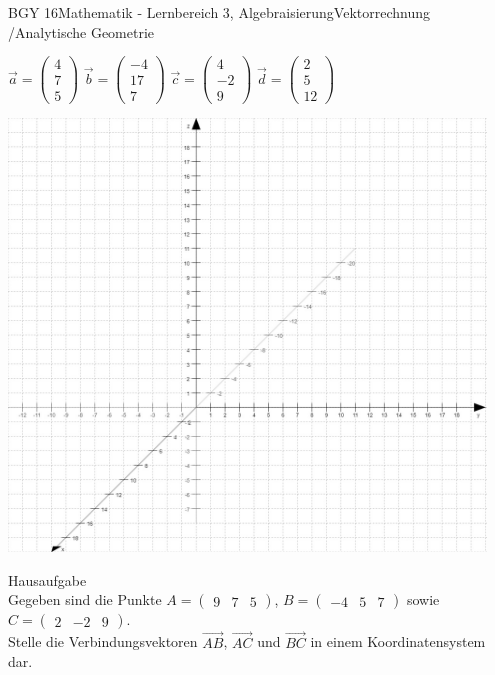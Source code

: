\documentclass[oneside,openany,headings=optiontotoc,11pt,numbers=noenddot]{scrreprt}
\begin{document}
\begin{worksheet}{BGY 16}{Mathematik - Lernbereich 3, Algebraisierung}{Vektorrechnung /Analytische Geometrie}
\begin{framed}
			\par
			\( \overrightarrow{a} = \begin{pmatrix} 4 \\ 7 \\ 5\end{pmatrix}\) \hfill \(\overrightarrow{b} = \begin{pmatrix}-4 \\ 17 \\ 7 \end{pmatrix}\) \hfill \( \overrightarrow{c} = \begin{pmatrix}4 \\ -2 \\ 9\end{pmatrix}\) \hfill \( \overrightarrow{d} = \begin{pmatrix}
			2 \\ 5 \\ 12 \end{pmatrix}\)
			\par
			\bigskip
			\noindent
			\includegraphics[width=0.95\textwidth]{Koord3D.jpg}
		\end{framed}
		\begin{framed}
			\color{codegray}\tiny{Hausaufgabe}\\
			\color{black}
			\noindent
			\normalsize
			Gegeben sind die Punkte \( A = \begin{pmatrix} 9 & 7 & 5\end{pmatrix}\), \(B = \begin{pmatrix}-4 & 5 & 7 \end{pmatrix}\) sowie \( C = \begin{pmatrix}2 & -2 & 9\end{pmatrix}\).\\
			Stelle die Verbindungsvektoren 
			\( \overrightarrow{AB}\), \(\overrightarrow{AC}\) und \(\overrightarrow{BC}\) in einem Koordinatensystem dar.
		\end{framed}
	\end{worksheet}
\end{document}
